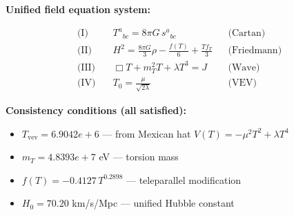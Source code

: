 
\textbf{Unified field equation system:}

\begin{align}
  \text{(I)} \quad & T^a{}_{bc} = 8\pi G \, s^a{}_{bc} && \text{(Cartan)} \\
  \text{(II)} \quad & H^2 = \frac{8\pi G}{3}\rho - \frac{f(T)}{6} + \frac{Tf_T}{3} && \text{(Friedmann)} \\
  \text{(III)} \quad & \Box T + m_T^2 T + \lambda T^3 = J && \text{(Wave)} \\
  \text{(IV)} \quad & T_0 = \frac{\mu}{\sqrt{2\lambda}} && \text{(VEV)}
\end{align}

\textbf{Consistency conditions (all satisfied):}
\begin{itemize}
  \item $T_{\text{vev}} = 6.9042e+6$ — from Mexican hat $V(T) = -\mu^2 T^2 + \lambda T^4$
  \item $m_T = 4.8393e+7$ eV — torsion mass
  \item $f(T) = -0.4127 \, T^{0.2898}$ — teleparallel modification
  \item $H_0 = 70.20$ km/s/Mpc — unified Hubble constant
\end{itemize}